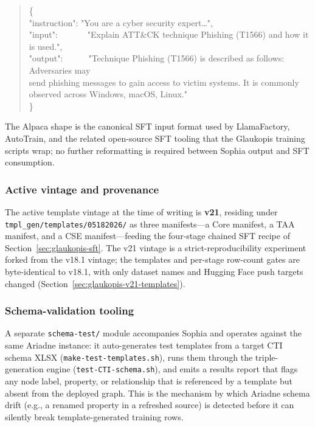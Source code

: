 \documentclass[unnumsec,webpdf,contemporary,large]{oup-authoring-template}
\theoremstyle{thmstyleone}
\theoremstyle{thmstyletwo}
\theoremstyle{thmstylethree}
\begin{document}
\begin{quote}\small\ttfamily
\{\\
\hspace*{1em}"instruction": "You are a cyber security expert\ldots",\\
\hspace*{1em}"input":\ \ \ \ \ \ \ "Explain ATT\&CK technique Phishing (T1566) and how it is used.",\\
\hspace*{1em}"output":\ \ \ \ \ \ "Technique Phishing (T1566) is described as follows: Adversaries may\\
\hspace*{1em}\hspace*{1em}\hspace*{1em} send phishing messages to gain access to victim systems. It is commonly\\
\hspace*{1em}\hspace*{1em}\hspace*{1em} observed across Windows, macOS, Linux."\\
\}
\end{quote}

The Alpaca shape is the canonical SFT input format used by LlamaFactory, AutoTrain, and the related open-source SFT tooling that the Glaukopis training scripts wrap; no further reformatting is required between Sophia output and SFT consumption.

\subsubsection*{Active vintage and provenance}
The active template vintage at the time of writing is \textbf{v21}, residing under \texttt{tmpl\_gen/templates/05182026/} as three manifests---a Core manifest, a TAA manifest, and a CSE manifest---feeding the four-stage chained SFT recipe of Section~\ref{sec:glaukopis-sft}. The v21 vintage is a strict-reproducibility experiment forked from the v18.1 vintage; the templates and per-stage row-count gates are byte-identical to v18.1, with only dataset names and Hugging Face push targets changed (Section~\ref{sec:glaukopis-v21-templates}).

\subsubsection*{Schema-validation tooling}
A separate \texttt{schema-test/} module accompanies Sophia and operates against the same Ariadne instance: it auto-generates test templates from a target CTI schema XLSX (\texttt{make-test-templates.sh}), runs them through the triple-generation engine (\texttt{test-CTI-schema.sh}), and emits a results report that flags any node label, property, or relationship that is referenced by a template but absent from the deployed graph. This is the mechanism by which Ariadne schema drift (e.g., a renamed property in a refreshed source) is detected before it can silently break template-generated training rows.
\end{document}
